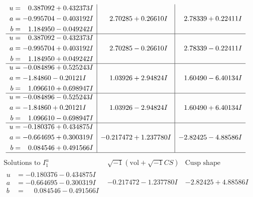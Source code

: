 \documentclass[1p]{elsarticle_modified}
\theoremstyle{definition}
\newcommand{\I}{\sqrt{-1}}
\begin{document}
$$\begin{array}{c|c|c}
\begin{aligned}
u &= \phantom{-}0.387092 + 0.432373 I \\
a &= -0.995704 - 0.403192 I \\
b &= \phantom{-}1.184950 - 0.049242 I\end{aligned}
 & \phantom{-}2.70285 + 0.26610 I & \phantom{-}2.78339 + 0.22411 I \\ \hline\begin{aligned}
u &= \phantom{-}0.387092 - 0.432373 I \\
a &= -0.995704 + 0.403192 I \\
b &= \phantom{-}1.184950 + 0.049242 I\end{aligned}
 & \phantom{-}2.70285 - 0.26610 I & \phantom{-}2.78339 - 0.22411 I \\ \hline\begin{aligned}
u &= -0.084896 + 0.525243 I \\
a &= -1.84860 - 0.20121 I \\
b &= \phantom{-}1.096610 + 0.698947 I\end{aligned}
 & \phantom{-}1.03926 + 2.94824 I & \phantom{-}1.60490 - 6.40134 I \\ \hline\begin{aligned}
u &= -0.084896 - 0.525243 I \\
a &= -1.84860 + 0.20121 I \\
b &= \phantom{-}1.096610 - 0.698947 I\end{aligned}
 & \phantom{-}1.03926 - 2.94824 I & \phantom{-}1.60490 + 6.40134 I \\ \hline\begin{aligned}
u &= -0.180376 + 0.434875 I \\
a &= -0.664695 + 0.300319 I \\
b &= \phantom{-}0.084546 + 0.491566 I\end{aligned}
 & -0.217472 + 1.237780 I & -2.82425 - 4.88586 I\\
 \hline 
 \end{array}$$\newpage$$\begin{array}{c|c|c}  
\text{Solutions to }I^u_{1}& \I (\text{vol} + \sqrt{-1}CS) & \text{Cusp shape}\\
 \hline 
\begin{aligned}
u &= -0.180376 - 0.434875 I \\
a &= -0.664695 - 0.300319 I \\
b &= \phantom{-}0.084546 - 0.491566 I\end{aligned}
 & -0.217472 - 1.237780 I & -2.82425 + 4.88586 I \\ \hline\begin{aligned}

\end{aligned}
\end{array}$$
\end{document}

